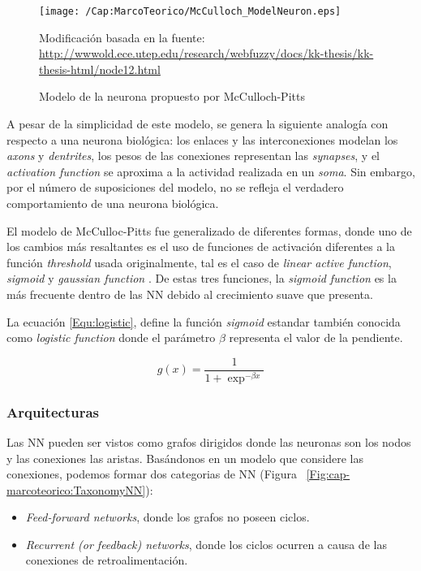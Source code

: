 \begin{figure}[h]
  \centering
  \texttt{[image: /Cap:MarcoTeorico/McCulloch\_ModelNeuron.eps]}
  \caption{Modelo de la neurona propuesto por McCulloch-Pitts}
  \tiny{Modificación basada en la fuente: 
  \url{http://wwwold.ece.utep.edu/research/webfuzzy/docs/kk-thesis/kk-thesis-html/node12.html}}
  \label{Fig:cap-marcoteorico:McCulloch-NeuronModel}
\end{figure}

A pesar de la simplicidad de este modelo, se genera la siguiente analogía con 
respecto a una neurona biológica: los enlaces y las interconexiones modelan 
los \textit{axons} y \textit{dentrites}, los pesos de las conexiones 
representan las \textit{synapses}, y el \textit{activation function} se 
aproxima a la actividad realizada en un \textit{soma}. Sin embargo, por el 
número de suposiciones del modelo, no se refleja el verdadero comportamiento 
de una neurona biológica.

El modelo de McCulloc-Pitts fue generalizado de diferentes formas, donde uno
de los cambios más resaltantes es el uso de funciones de activación diferentes
a la función \textit{threshold} usada originalmente, tal es el caso de 
\textit{linear active function}, \textit{sigmoid} y \textit{gaussian function}
. De estas tres funciones, la \textit{sigmoid function} \cite{Han:1995:TIofSF}
es la más frecuente dentro de las NN debido al crecimiento suave que presenta. 

La ecuación \ref{Equ:logistic}, define la función \textit{sigmoid} estandar
también conocida como \textit{logistic function} donde el parámetro $\beta$
representa el valor de la pendiente.

\begin{equation}
g(x) = \frac{1}{1 + \exp^{-\beta x}}
\label{Equ:logistic}
\end{equation}

\subsubsection{Arquitecturas}
Las NN pueden ser vistos como grafos dirigidos donde las neuronas son los
nodos y las conexiones las aristas. Basándonos en un modelo que considere las 
conexiones, podemos formar dos categorias de NN (Figura~
\ref{Fig:cap-marcoteorico:TaxonomyNN}):
\begin{itemize}
  \item \textit{Feed-forward networks}, donde los grafos no poseen ciclos.
  \item \textit{Recurrent (or feedback) networks}, donde los ciclos ocurren a 
  causa de las conexiones de retroalimentación.
\end{itemize}

